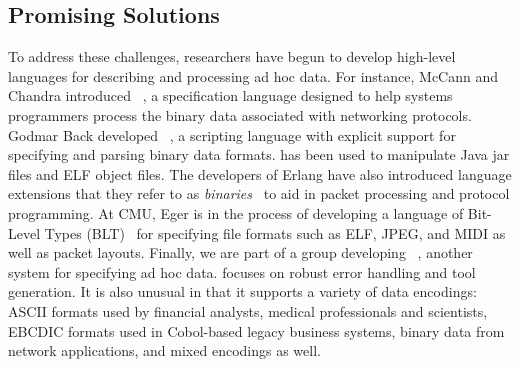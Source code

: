 \subsection{Promising Solutions}

To address these challenges, 
researchers have begun to develop high-level languages 
for describing and processing ad hoc data.  For instance,
McCann and Chandra introduced
\packettypes{}~\cite{sigcomm00}, a specification language designed to help 
systems programmers process the binary data associated
with networking protocols.  Godmar Back developed
\datascript{}~\cite{gpce02}, a scripting language with explicit
support for specifying and parsing binary data formats. \datascript{}
has been used to manipulate Java jar files and ELF object files.  The
developers of Erlang have also introduced language extensions that
they refer to as {\em binaries}~\cite{erlang-bits,gustafsson+:binaries} 
to aid in packet
processing and protocol programming.  At CMU, Eger is in the process
of developing a
language of Bit-Level Types (BLT)~\cite{eger:blt} for specifying file
formats such as ELF, JPEG, and MIDI as well as packet layouts.
Finally, we are part of a group developing
\pads{}~\cite{fisher+:pads}, another system for specifying ad hoc data.
\pads{} focuses on robust error handling and tool generation.
It is also unusual in that it supports a variety of data encodings:
ASCII formats used by financial analysts, medical professionals and scientists,
EBCDIC formats used in Cobol-based legacy business systems,
binary data from network applications, and mixed encodings as well.



